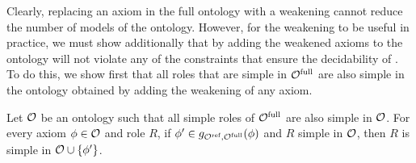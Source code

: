 \documentclass[
]{ceurart}
\begin{document}

Clearly, replacing an axiom in the full ontology with a weakening cannot reduce the number of models of the ontology. However, for the weakening to be useful in practice, we must show additionally that by adding the weakened axioms to the ontology will not violate any of the constraints that ensure the decidability of \SROIQ. To do this, we show first that all roles that are simple in ${\mathcal{O}^\textnormal{full}}$ are also simple in the ontology obtained by adding the weakening of any axiom.

\begin{lemma} \label{lem:simple-roles}
  Let $\mathcal{O}$ be an ontology such that all simple roles of ${\mathcal{O}^\textnormal{full}}$ are also simple in $\mathcal{O}$. For every axiom $\phi \in \mathcal{O}$ and role $R$, if $\phi' \in g_{{\mathcal{O}^\textnormal{ref}},{\mathcal{O}^\textnormal{full}}}(\phi)$ and $R$ simple in $\mathcal{O}$, then $R$ is simple in $\mathcal{O} \cup \{ \phi' \}$.
\end{lemma}

\end{document}
